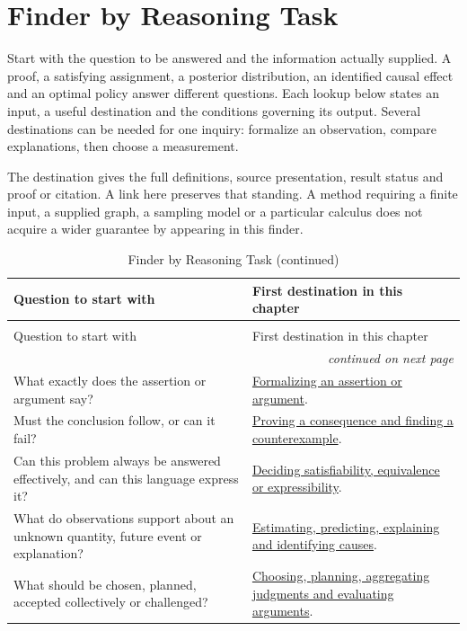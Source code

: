 \chapter{Finder by Reasoning Task}
\label{sec:p14-reasoning-task-finder}

Start with the question to be answered and the information actually supplied.
A proof, a satisfying assignment, a posterior distribution, an identified
causal effect and an optimal policy answer different questions. Each lookup
below states an input, a useful destination and the conditions governing its
output. Several destinations can be needed for one inquiry: formalize an
observation, compare explanations, then choose a measurement.

The destination gives the full definitions, source presentation, result status
and proof or citation. A link here preserves that standing. A method requiring
a finite input, a supplied graph, a sampling model or a particular calculus
does not acquire a wider guarantee by appearing in this finder.

\begin{longtable}{@{}p{}p{}@{}}
\caption{Finder by Reasoning Task}\\
\toprule
Question to start with & First destination in this chapter \\
\midrule
\endfirsthead
\caption[]{Finder by Reasoning Task (continued)}\\
\toprule
Question to start with & First destination in this chapter \\
\midrule
\endhead
\midrule\multicolumn{2}{r}{\emph{continued on next page}}\\
\endfoot
\endlastfoot
What exactly does the assertion or argument say? &
\hyperref[sec:p14-finder-formalizing]{Formalizing an assertion or argument}. \\
Must the conclusion follow, or can it fail? &
\hyperref[sec:p14-finder-proving]{Proving a consequence and finding a counterexample}. \\
Can this problem always be answered effectively, and can this language express it? &
\hyperref[sec:p14-finder-deciding]{Deciding satisfiability, equivalence or expressibility}. \\
What do observations support about an unknown quantity, future event or explanation? &
\hyperref[sec:p14-finder-evidence]{Estimating, predicting, explaining and identifying causes}. \\
What should be chosen, planned, accepted collectively or challenged? &
\hyperref[sec:p14-finder-choosing]{Choosing, planning, aggregating judgments and evaluating arguments}. \\
\bottomrule
\end{longtable}

